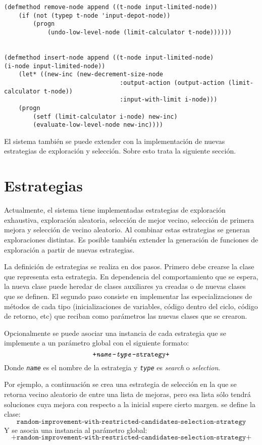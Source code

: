 \begin{lstlisting}
(defmethod remove-node append ((t-node input-limited-node))
	(if (not (typep t-node 'input-depot-node))
		(progn
			(undo-low-level-node (limit-calculator t-node))))))


(defmethod insert-node append ((t-node input-limited-node) 
(i-node input-limited-node))
	(let* ((new-inc (new-decrement-size-node 
								:output-action (output-action (limit-calculator t-node))
								:input-with-limit i-node)))
	(progn
		(setf (limit-calculator i-node) new-inc)
		(evaluate-low-level-node new-inc))))
\end{lstlisting}

El sistema también se puede extender con la implementación de nuevas estrategias de exploración y selección. Sobre esto trata la siguiente sección.

\section{Estrategias}\label{4-generator}
Actualmente, el sistema tiene implementadas estrategias de exploración exhaustiva, exploración aleatoria, selección de mejor vecino, selección de primera mejora y selección de vecino aleatorio. Al combinar estas estrategias se generan exploraciones distintas. Es posible también extender la generación de funciones de exploración a partir de nuevas estrategias.

La definición de estrategias se realiza en dos pasos. Primero debe crearse la clase que representa esta estrategia. En dependencia del comportamiento que se espera, la nueva clase puede heredar de clases auxiliares ya creadas o de nuevas clases que se definen. El segundo paso consiste en implementar las especializaciones de métodos de cada tipo (inicializaciones de variables, código dentro del ciclo, código de retorno, etc) que reciban como parámetros las nuevas clases que se crearon.

Opcionalmente se puede asociar una instancia de cada estrategia que se implemente a un parámetro global con el siguiente formato: $$\texttt{+\textit{name}-\textit{type}-strategy+}$$ Donde \texttt{\textit{name}} es el nombre de la estrategia y \texttt{\textit{type}} es \textit{search} o \textit{selection}.


Por ejemplo, a continuación se crea una estrategia de selección en la que se retorna vecino aleatorio de entre una lista de mejoras, pero esa lista sólo tendrá soluciones cuya mejora con respecto a la inicial supere cierto margen. se define la clase: $$\texttt{random-improvement-with-restricted-candidates-selection-strategy}$$ Y se asocia una instancia al parámetro global: $$\texttt{+random-improvement-with-restricted-candidates-selection-strategy+}$$


